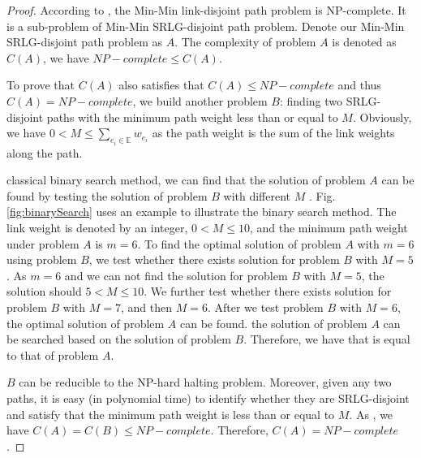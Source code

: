 \begin{proof}
According to \cite{bhatia2006finding}, the Min-Min link-disjoint path problem is NP-complete.  It is a sub-problem of Min-Min SRLG-disjoint path problem. Denote our Min-Min SRLG-disjoint path problem as $A$. The complexity of  problem $A$ is denoted as $C(A)$, we have $NP-complete\leq C(A) $.

To prove that $C(A)$ also satisfies that $C(A) \leq NP-complete$ and thus $C(A)= NP-complete$, we build another problem $B$:  finding two SRLG-disjoint paths with the minimum path weight less than or equal to $M$. Obviously, we have $0< M \le \sum\limits_{e_i\in \mathbb{E}}w_{e_i}$ as the path weight is  the sum of the link weights along the path. 

 classical binary search method, we can find that the solution of  problem $A$ can be found by testing the solution of problem $B$ with different $M$ .  Fig.\ref {fig:binarySearch} uses an example to illustrate the binary search method.  The link weight  is denoted by an integer, $0 < M \le 10$, and the minimum path weight under  problem $A$ is $m=6$. To find the optimal solution of problem $A$ with $m=6$ using problem $B$, we   test whether there exists solution for problem $B$ with $M=5$. As $m=6$ and we can not find the solution for problem $B$ with $M=5$,   the solution should  $5< M \le 10$.  We  further test whether there exists  solution for problem $B$ with $M=7$, and then $M=6$. After we test problem $B$ with $M=6$, the optimal solution of  problem $A$ can be found.   the solution of problem $A$ can be searched based on the solution of problem $B$. Therefore, we have that   is equal to that of problem $A$.

 $B$ can be reducible to the NP-hard halting problem. Moreover, given any two paths, it is easy (in polynomial time) to identify whether they are SRLG-disjoint and satisfy that the minimum path weight is less than or equal to $M$.
As , we have $C(A)=C(B) \le NP-complete$. Therefore, $C(A)=NP-complete$.





\end{proof}
